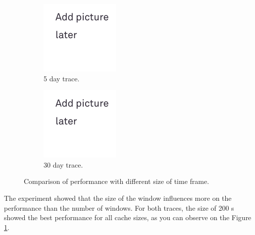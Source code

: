 \begin{figure}[t!]
	\centering
	
	\begin{subfigure}[b]{0.49\linewidth}
		\includegraphics[width=\linewidth]{pics/todo.png}
		\caption{5 day trace.}
	\end{subfigure}
	\begin{subfigure}[b]{0.49\linewidth}
		\includegraphics[width=\linewidth]{pics/todo.png}
		\caption{30 day trace.}
	\end{subfigure}
	\caption{Comparison of performance with different size of time frame.}
	\label{fig:cache6}
\end{figure}

The experiment showed that the size of the window influences more on the performance than the number of windows. For both traces, the size of 200 s showed the best performance for all cache sizes, as you can observe on the Figure \ref{fig:cache6}.